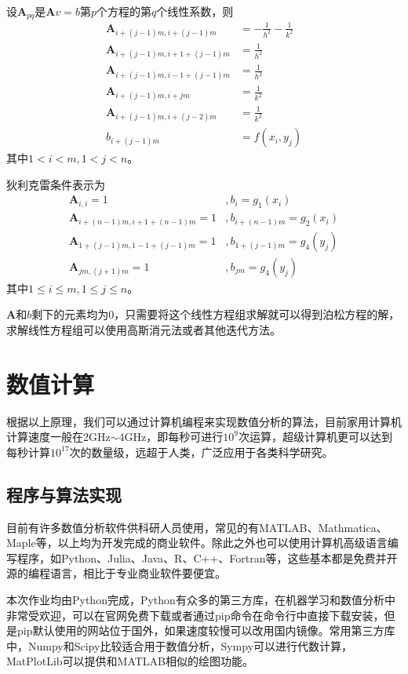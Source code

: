 \documentclass[UTF8,a4paper,10pt]{ctexart}
\begin{document}
\begin{multicols}{2}
            设$\bm{A}_{pq}$是$\bm{A}v=b$第$p$个方程的第$q$个线性系数，则
            \begin{equation}
                \begin{split}
                    \bm{A}_{i+(j-1)m,i+(j-1)m} &= -\frac{1}{h^2}-\frac{1}{k^2}\\
                    \bm{A}_{i+(j-1)m,i+1+(j-1)m} &= \frac{1}{h^2}\\
                    \bm{A}_{i+(j-1)m,i-1+(j-1)m} &= \frac{1}{h^2}\\
                    \bm{A}_{i+(j-1)m,i+jm} &= \frac{1}{k^2}\\
                    \bm{A}_{i+(j-1)m,i+(j-2)m} &= \frac{1}{k^2}\\
                    b_{i+(j-1)m} &= f(x_i,y_j)
                \end{split}
            \end{equation}
            其中$1<i<m,1<j<n$。\par
            狄利克雷条件表示为
            \begin{equation}
                \begin{split}
                    \bm{A}_{i,i} = 1&,b_{i} = g_1(x_i)\\
                    \bm{A}_{i+(n-1)m,i+1+(n-1)m} = 1&,b_{i+(n-1)m} = g_2(x_i)\\
                    \bm{A}_{1+(j-1)m,1-1+(j-1)m} = 1&,b_{1+(j-1)m} = g_4(y_j)\\
                    \bm{A}_{jm,(j+1)m} = 1&,b_{jm} = g_4(y_j)
                \end{split}
            \end{equation}
            其中$1\le i\le m,1\le j\le n$。\par
            $\bm{A}$和$b$剩下的元素均为0，只需要将这个线性方程组求解就可以得到泊松方程的解，求解线性方程组可以使用高斯消元法或者其他迭代方法。
    \section{数值计算}
    根据以上原理，我们可以通过计算机编程来实现数值分析的算法，目前家用计算机计算速度一般在2GHz$\sim$4GHz，即每秒可进行$10^9$次运算，超级计算机更可以达到每秒计算$10^{17}$次的数量级，远超于人类，广泛应用于各类科学研究。
        \subsection{程序与算法实现}
        目前有许多数值分析软件供科研人员使用，常见的有MATLAB、Mathmatica、Maple等，以上均为开发完成的商业软件。除此之外也可以使用计算机高级语言编写程序，如Python、Julia、Java、R、C++、Fortran等，这些基本都是免费并开源的编程语言，相比于专业商业软件要便宜。\par
        本次作业均由Python完成，Python有众多的第三方库，在机器学习和数值分析中非常受欢迎，可以在官网免费下载或者通过pip命令在命令行中直接下载安装，但是pip默认使用的网站位于国外，如果速度较慢可以改用国内镜像。常用第三方库中，Numpy和Scipy比较适合用于数值分析，Sympy可以进行代数计算，MatPlotLib可以提供和MATLAB相似的绘图功能。\par

\end{multicols}
\end{document}
